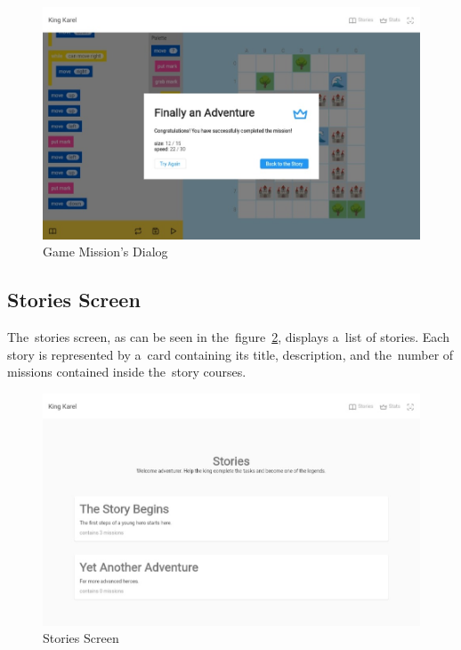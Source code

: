 \begin{figure}
    \centering
    \includegraphics[width=1\linewidth]{assets/implementation/ui/kingkarel_game_mission_dialog.jpeg}
    \caption{Game Mission's Dialog}
    \label{fig:implementation:ui:game-mission-dialog}
\end{figure}

\subsection{Stories Screen}

The~stories screen, as can be seen in the~figure~\ref{fig:implementation:ui:stories}, displays a~list of \mbox{stories}.
Each story is represented by a~card containing its title, description, and the~number of missions contained inside the~story courses.

\begin{figure}
    \centering
    \includegraphics[width=1\linewidth]{assets/implementation/ui/kingkarel_stories.jpeg}
    \caption{Stories Screen}
    \label{fig:implementation:ui:stories}
\end{figure}

